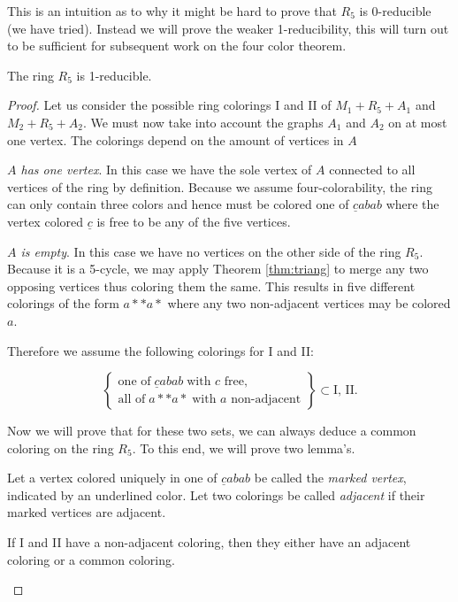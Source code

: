 This is an intuition as to why it might be hard to prove that $R_5$ is 0-reducible (we have tried). Instead we will prove the weaker 1-reducibility, this will turn out to be sufficient for subsequent work on the four color theorem.

\begin{theorem}
    The ring $R_5$ is 1-reducible.
\end{theorem}

\begin{proof}Let us consider the possible ring colorings I and II of $M_1 + R_5 + A_1$ and $M_2 + R_5 + A_2$. We must now take into account the graphs $A_1$ and $A_2$ on at most one vertex. The colorings depend on the amount of vertices in $A$

\emph{$A$ has one vertex}. In this case we have the sole vertex of $A$ connected to all vertices of the ring by definition. Because we assume four-colorability, the ring can only contain three colors and hence must be colored one of $\underline{c}abab$ where the vertex colored $\underline{c}$ is free to be any of the five vertices.

\emph{$A$ is empty}. In this case we have no vertices on the other side of the ring $R_5$. Because it is a 5-cycle, we may apply Theorem \ref{thm:triang} to merge any two opposing vertices thus coloring them the same. This results in five different colorings of the form $a{*}{*}a{*}$ where any two non-adjacent vertices may be colored $a$.

Therefore we assume the following colorings for I and II:

\begin{equation}
    \left\{ \begin{matrix}
        \text{one of}\;\underline{c}abab \; \text{with $c$ free}, \\
        \text{all of}\;a{*}{*}a{*} \; \text{with $a$  non-adjacent}
    \end{matrix}\right\} \subset \text{I, II}.
\end{equation}

Now we will prove that for these two sets, we can always deduce a common coloring on the ring $R_5$. To this end, we will prove two lemma's.

Let a vertex colored uniquely in one of $\underline{c}abab$ be called the \emph{marked vertex}, indicated by an underlined color. Let two colorings be called \emph{adjacent} if their marked vertices are adjacent.

\begin{lemma}
    \label{lem:r5_first}
    If I and II have a non-adjacent coloring, then they either have an adjacent coloring or a common coloring.
\end{lemma}


\end{proof}
